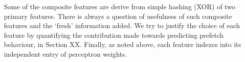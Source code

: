 Some of the composite features are derive from simple hashing (XOR) of
two primary features.  There is always a question of usefulness of
such composite features and the `fresh' information added.  We try to
justify the choice of each feature by quantifying the contribution
made towards predicting prefetch behaviour, in Section XX.  Finally,
as noted above, each feature indexes into its independent entry of
perceptron weights.
